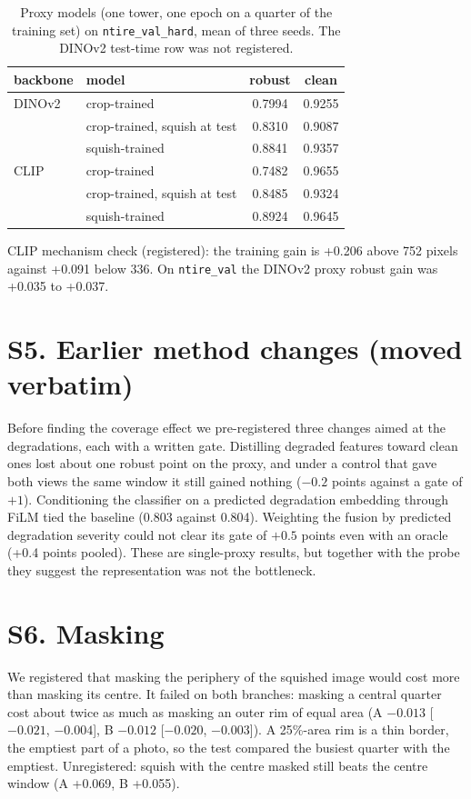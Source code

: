 \documentclass[10pt]{article}
\begin{document}
\begin{table}[h]
\centering
\small
\begin{tabular}{llcc}
\toprule
backbone & model & robust & clean \\
\midrule
DINOv2 & crop-trained & 0.7994 & 0.9255 \\
       & crop-trained, squish at test & 0.8310 & 0.9087 \\
       & squish-trained & 0.8841 & 0.9357 \\
\midrule
CLIP & crop-trained & 0.7482 & 0.9655 \\
     & crop-trained, squish at test & 0.8485 & 0.9324 \\
     & squish-trained & 0.8924 & 0.9645 \\
\bottomrule
\end{tabular}
\caption{Proxy models (one tower, one epoch on a quarter of the training set)
on \texttt{ntire\_val\_hard}, mean of three seeds. The DINOv2 test-time row
was not registered.}
\end{table}

CLIP mechanism check (registered): the training gain is +0.206 above 752
pixels against +0.091 below 336. On \texttt{ntire\_val} the DINOv2 proxy robust
gain was +0.035 to +0.037.

\section*{S5. Earlier method changes (moved verbatim)}

Before finding the coverage effect we pre-registered three changes aimed
at the degradations, each with a written gate. Distilling degraded features
toward clean ones lost about one robust point on the proxy, and under a
control that gave both views the same window it still gained nothing
($-0.2$ points against a gate of $+1$).
Conditioning the classifier on a predicted degradation embedding through FiLM
tied the baseline (0.803 against 0.804). Weighting the fusion by predicted
degradation severity could not clear its gate of $+0.5$ points even with an
oracle (+0.4 points pooled). These are single-proxy results, but together with the probe they
suggest the representation was not the bottleneck.

\section*{S6. Masking}

We registered that masking the periphery of the squished image would cost
more than masking its centre. It failed on both branches: masking a central
quarter cost about twice as much as masking an outer rim of equal area (A
$-0.013$ [$-0.021$, $-0.004$], B $-0.012$ [$-0.020$, $-0.003$]). A 25\%-area
rim is a thin border, the emptiest part of a photo, so the test compared the
busiest quarter with the emptiest. Unregistered: squish with the centre
masked still beats the centre window (A +0.069, B +0.055).
\end{document}

